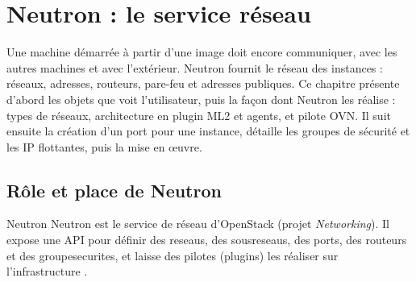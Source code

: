 
\section{Neutron : le service réseau}\label{chap:neutron}

Une machine démarrée à partir d'une image doit encore communiquer, avec les autres machines et avec l'extérieur. Neutron fournit
le réseau des instances : réseaux, adresses, routeurs, pare-feu et adresses publiques. Ce chapitre présente d'abord les objets
que voit l'utilisateur, puis la façon dont Neutron les réalise : types de réseaux, architecture en plugin ML2 et agents, et
pilote OVN. Il suit ensuite la création d'un port pour une instance, détaille les groupes de sécurité et les IP flottantes, puis
la mise en œuvre.

\subsection{Rôle et place de Neutron}\label{sec:neu-role}

\begin{definition}{Neutron}
Neutron est le service de réseau d'OpenStack (projet \emph{Networking}). Il expose une API pour définir des
\glspl{reseau}, des \glspl{sousreseau}, des \glspl{port}, des \glspl{routeur} et des \glspl{groupesecurite}, et laisse des
pilotes (plugins) les réaliser sur l'infrastructure \parencite{neutron-intro}.
\end{definition}

